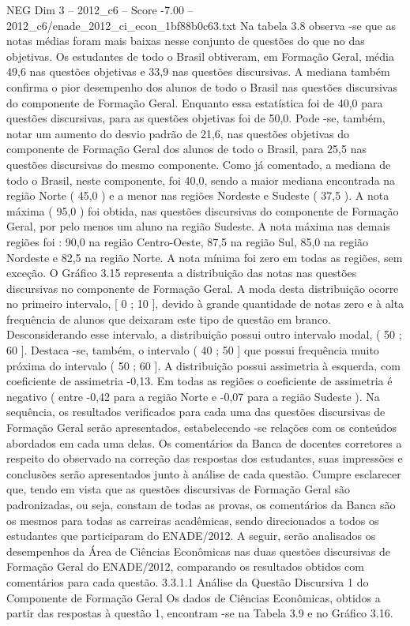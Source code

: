 \begin{textsample}{NEG Dim 3 – 2012\_c6 – Score -7.00 – 2012\_c6/enade\_2012\_ci\_econ\_1bf88b0c63.txt}
Na tabela 3.8 observa -se que as notas médias foram mais baixas nesse conjunto de questões do que no das objetivas.
Os estudantes de todo o Brasil obtiveram, em Formação Geral, média 49,6 nas questões objetivas e 33,9 nas questões discursivas.
A mediana também confirma o pior desempenho dos alunos de todo o Brasil nas questões discursivas do componente de Formação Geral.
Enquanto essa estatística foi de 40,0 para questões discursivas, para as questões objetivas foi de 50,0.
Pode -se, também, notar um aumento do desvio padrão de 21,6, nas questões objetivas do componente de Formação Geral dos alunos de todo o Brasil, para 25,5 nas questões discursivas do mesmo componente.
Como já comentado, a mediana de todo o Brasil, neste componente, foi 40,0, sendo a maior mediana encontrada na região Norte ( 45,0 ) e a menor nas regiões Nordeste e Sudeste ( 37,5 ).
A nota máxima ( 95,0 ) foi obtida, nas questões discursivas do componente de Formação Geral, por pelo menos um aluno na região Sudeste.
A nota máxima nas demais regiões foi : 90,0 na região Centro-Oeste, 87,5 na região Sul, 85,0 na região Nordeste e 82,5 na região Norte.
A nota mínima foi zero em todas as regiões, sem exceção.
O Gráfico 3.15 representa a distribuição das notas nas questões discursivas no componente de Formação Geral.
A moda desta distribuição ocorre no primeiro intervalo, [ 0 ; 10 ], devido à grande quantidade de notas zero e à alta frequência de alunos que deixaram este tipo de questão em branco.
Desconsiderando esse intervalo, a distribuição possui outro intervalo modal, ( 50 ; 60 ].
Destaca -se, também, o intervalo ( 40 ; 50 ] que possui frequência muito próxima do intervalo ( 50 ; 60 ].
A distribuição possui assimetria à esquerda, com coeficiente de assimetria -0,13.
Em todas as regiões o coeficiente de assimetria é negativo ( entre -0,42 para a região Norte e -0,07 para a região Sudeste ).
Na sequência, os resultados verificados para cada uma das questões discursivas de Formação Geral serão apresentados, estabelecendo -se relações com os conteúdos abordados em cada uma delas.
Os comentários da Banca de docentes corretores a respeito do observado na correção das respostas dos estudantes, suas impressões e conclusões serão apresentados junto à análise de cada questão.
Cumpre esclarecer que, tendo em vista que as questões discursivas de Formação Geral são padronizadas, ou seja, constam de todas as provas, os comentários da Banca são os mesmos para todas as carreiras acadêmicas, sendo direcionados a todos os estudantes que participaram do ENADE/2012.
A seguir, serão analisados os desempenhos da Área de Ciências Econômicas nas duas questões discursivas de Formação Geral do ENADE/2012, comparando os resultados obtidos com comentários para cada questão. 3.3.1.1 Análise da Questão Discursiva 1 do Componente de Formação Geral Os dados de Ciências Econômicas, obtidos a partir das respostas à questão 1, encontram -se na Tabela 3.9 e no Gráfico 3.16.

\end{textsample}
